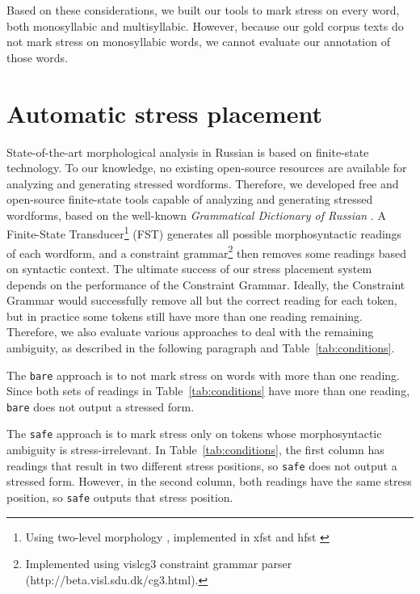 \documentclass[11pt]{article}
\begin{document}
Based on these considerations, we built our tools to mark stress on every
word, both monosyllabic and multisyllabic. However, because our gold corpus texts 
do not mark stress on monosyllabic words, we cannot evaluate our annotation of 
those words.

\section{Automatic stress placement}

State-of-the-art morphological analysis in Russian is based on finite-state
technology\cite{Nozhov-03,Segalovich-03}. To our knowledge, no existing 
open-source resources are available for analyzing and generating 
stressed wordforms. Therefore, we developed free and open-source finite-state 
tools capable of analyzing and generating stressed wordforms, based on the
well-known \emph{Grammatical Dictionary of Russian} \cite{Zaliznjak-77}.
A Finite-State Transducer\footnote{Using two-level 
morphology \cite{Koskenniemi-84}, implemented in xfst \cite{Beesley.Karttunen-03} and hfst \cite{hfst-11}} (FST) generates all possible 
morphosyntactic readings of each wordform, and a constraint 
grammar\footnote{Implemented using vislcg3 constraint grammar parser (http://beta.visl.sdu.dk/cg3.html).}
\cite{Karlsson-90,Karlsson.Voutilainen.ea-95} then removes
some readings based on syntactic context. The ultimate success of our 
stress placement system depends on the performance of the Constraint Grammar. 
Ideally, the Constraint Grammar would successfully remove all but the correct 
reading for each token, but in practice some
tokens still have more than one reading remaining. Therefore,
we also evaluate various approaches to deal with the remaining ambiguity,
as described in the following paragraph and Table~\ref{tab:conditions}.

The {\small {\tt bare}} approach is to not mark stress on words with more than 
one reading. Since both sets of readings in Table~\ref{tab:conditions} have more
than one reading, {\small {\tt bare}} does not output a stressed form. 

The {\small {\tt safe}} approach is to mark stress only on
tokens whose morphosyntactic ambiguity is stress-irrelevant. In 
Table~\ref{tab:conditions}, the first column has readings that result in two
different stress positions, so {\small {\tt safe}} does not output a stressed
form. However, in the second column, both readings have the same stress position, 
so {\small {\tt safe}} outputs that stress position.
\end{document}
